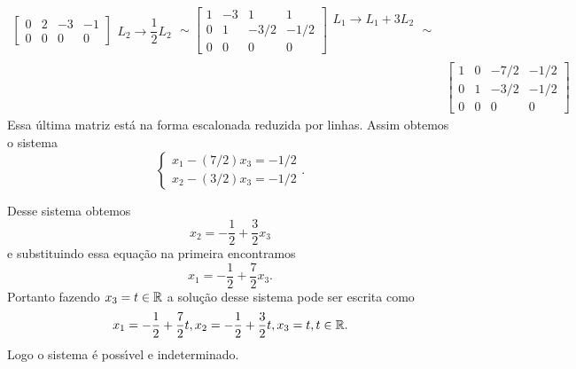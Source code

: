 \begin{exemplos}
\begin{enumerate}[label={\arabic*})]
\begin{solucao}
\begin{align*}
\begin{bmatrix}
                        0 & 2 & -3 & -1\\
                0 & 0 & 0 & 0
                    \end{bmatrix}
                    \begin{array}{l}
                        \phantom{x}\\ L_2 \to \dfrac{1}{2}L_2\\\phantom{x}
                    \end{array} \sim
                    \begin{bmatrix}
                1 & -3 & 1 & 1\\
                        0 & 1 & -3/2 & -1/2\\
                0 & 0 & 0 & 0
                    \end{bmatrix}
                    \begin{array}{l}
                        L_1 \to L_1 + 3L_2\\\phantom{x}\\\phantom{x}
                    \end{array} \sim\\
                    &\begin{bmatrix}
                1 & 0 & -7/2 & -1/2\\
                        0 & 1 & -3/2 & -1/2\\
                0 & 0 & 0 & 0
                    \end{bmatrix}
                \end{align*}
                Essa \'ultima matriz est\'a na forma escalonada reduzida por linhas. Assim obtemos o sistema
                \[
                    \begin{cases}
                        x_1 - (7/2)x_3 = -1/2\\
                        x_2 - (3/2)x_3 = -1/2
                    \end{cases}.
                \]

                Desse sistema obtemos
                \[
                    x_2 = -\dfrac{1}{2} + \dfrac{3}{2}x_3
                \]
                e substituindo essa equa\c{c}\~ao na primeira encontramos
                \[
                    x_1 = -\dfrac{1}{2} + \dfrac{7}{2}x_3.
                \]
                Portanto fazendo $x_3 = t \in \mathbb{R}$ a solu\c{c}\~ao desse sistema pode ser escrita como
                \[
                    x_1 = -\dfrac{1}{2} + \dfrac{7}{2}t, x_2 = -\dfrac{1}{2} + \dfrac{3}{2}t, x_3 = t, t \in \mathbb{R}.
                \]
                Logo o sistema \'e poss{\'\i}vel e indeterminado.
            \end{solucao}
    \end{enumerate}
\end{exemplos}
    
